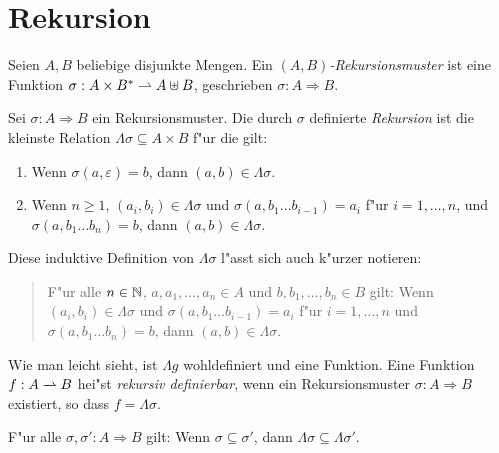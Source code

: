 \documentclass[12pt,a4paper]{article}
\begin{document}
\section{Rekursion}

\begin{definition}[Rekursionsmuster]
  Seien $A,B$ beliebige disjunkte Mengen. Ein \emph{$(A,B)$-Rekursionsmuster} ist eine Funktion
  $\sigma: A \times B^* \rightharpoonup A \uplus B$, geschrieben $\sigma: A \Rightarrow B$.
\end{definition}

\begin{definition}[Rekursion]
  Sei $\sigma: A \Rightarrow B$ ein Rekursionsmuster. Die durch $\sigma$ definierte \emph{Rekursion}
  ist die kleinste Relation $\Lambda \sigma \subseteq A \times B$ f"ur die gilt:
  \begin{enumerate}
  \item Wenn $\sigma(a,\varepsilon) = b$, dann $(a,b) \in \Lambda \sigma$.
  \item Wenn $n \ge 1$, $(a_i,b_i) \in \Lambda \sigma$ und $\sigma(a,b_1 \ldots b_{i-1})=a_i$ f"ur $i=1,\ldots,n$,
    und $\sigma(a,b_1 \ldots b_n) = b$, dann $(a,b) \in \Lambda \sigma$.
  \end{enumerate}
\end{definition}
Diese induktive Definition von $\Lambda \sigma$ l"asst sich auch k"urzer notieren:
\begin{quote}
  F"ur alle $n \in \mathbb N$, $a, a_1,\ldots,a_n \in A$ und $b,b_1,\ldots,b_n\in B$ gilt: 
  Wenn $(a_i,b_i)\in\Lambda\sigma$ und $\sigma(a,b_1 \ldots b_{i-1}) = a_i$ f"ur $i = 1,\ldots,n$ und
  $\sigma(a,b_1 \ldots b_n) = b$, dann $(a,b)\in\Lambda \sigma$.
\end{quote}
Wie man leicht sieht, ist $\Lambda g$ wohldefiniert und eine Funktion.
Eine Funktion $f : A \rightharpoonup B$ hei"st \emph{rekursiv definierbar}, wenn ein Rekursionsmuster
$\sigma: A \Rightarrow B$ existiert, so dass $f = \Lambda \sigma$.

\begin{lemma}[Monotonie] \label{lemma:Monotonie}
  F"ur alle $\sigma,\sigma': A \Rightarrow B$ gilt:
  Wenn $\sigma \subseteq \sigma'$, dann $\Lambda \sigma \subseteq \Lambda \sigma'$.
\end{lemma}
\end{document}
